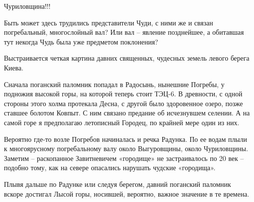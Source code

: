 Чуриловщина!!!

Быть может здесь трудились представители Чуди, с ними же и связан погребальный, многослойный вал? Или вал – явление позднейшее, а обитавшая тут некогда Чудь была уже предметом поклонения?

Выстраивается четкая картина давних священных, чудесных земель левого берега Киева.

Сначала поганский паломник попадал в Радосынь, нынешние Погребы, у подножия высокой горы, на которой теперь стоит ТЭЦ-6. В древности, с одной стороны этого холма протекала Десна, с другой было здоровенное озеро, позже ставшее болотом Ковпыт. С ним связано предание об исчезнувшем селении. А на самой горе я предполагаю летописный Городец, по крайней мере один из них.

Вероятно где-то возле Погребов начиналась и речка Радунка. По ее водам плыли к многоярусному погребальному валу около Выгуровщины, около Чуриловщины. Заметим – раскопанное Завитневичем «городище» не застраивалось по 20 век – подобно тому, как на севере опасались нарушать чудские «городища». 

Плывя дальше по Радунке или следуя берегом, давний поганский паломник вскоре достигал Лысой горы, носившей, вероятно, важное значение в те времена.
